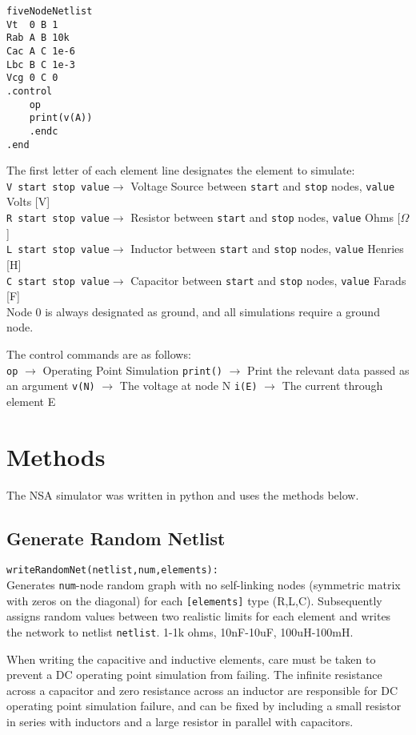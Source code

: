 \documentclass[11pt,twoside]{mitthesis}
\begin{document}
\begin{Verbatim}[fontsize=\footnotesize]
fiveNodeNetlist
Vt	0 B 1
Rab A B 10k
Cac A C 1e-6
Lbc B C 1e-3
Vcg 0 C 0
.control
	op
	print(v(A))
	.endc
.end
\end{Verbatim}

The first letter of each element line designates the element to simulate: \\
\texttt{V start stop value}$\rightarrow$ Voltage Source between \texttt{start} and \texttt{stop} nodes, \texttt{value} Volts [V]\\
\texttt{R start stop value}$\rightarrow$ Resistor between \texttt{start} and \texttt{stop} nodes, \texttt{value} Ohms [$\Omega$]\\
\texttt{L start stop value}$\rightarrow$ Inductor between \texttt{start} and \texttt{stop} nodes, \texttt{value} Henries [H]\\
\texttt{C start stop value}$\rightarrow$ Capacitor between \texttt{start} and \texttt{stop} nodes, \texttt{value} Farads [F]\\

Node 0 is always designated as ground, and all simulations require a ground node.

The control commands are as follows:\\
\texttt{op} $\rightarrow$ Operating Point Simulation
\texttt{print()} $\rightarrow$ Print the relevant data passed as an argument
\texttt{v(N)} $\rightarrow$ The voltage at node N
\texttt{i(E)} $\rightarrow$ The current through element E

\section{Methods}
The NSA simulator was written in python and uses the methods below.

\subsection{Generate Random Netlist}
\texttt{writeRandomNet(netlist,num,elements):}\\
Generates \texttt{num}-node random graph with no self-linking nodes (symmetric matrix with zeros on the diagonal) for each \texttt{[elements]} type (R,L,C).
Subsequently assigns random values between two realistic limits for each element and writes the network to netlist \texttt{netlist}.
1-1k ohms, 10nF-10uF, 100uH-100mH.

When writing the capacitive and inductive elements, care must be taken to prevent a DC operating point simulation from failing.
The infinite resistance across a capacitor and zero resistance across an inductor are responsible for DC operating point simulation failure, and can be fixed by including a small resistor in series with inductors and a large resistor in parallel with capacitors. 
\end{document}
